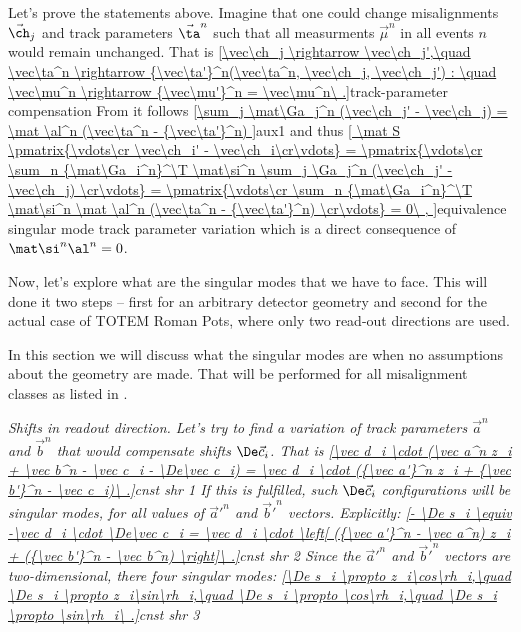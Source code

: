 Let's prove the statements above. Imagine that one could change misalignments $\vec\ch_j$ and track parameters $\vec\ta^n$ such that all measurments $\vec\mu^n$ in all events $n$ would remain unchanged. That is
\eqref{\vec\ch_j \rightarrow \vec\ch_j',\quad \vec\ta^n \rightarrow {\vec\ta'}^n(\vec\ta^n, \vec\ch_j, \vec\ch_j') : \quad \vec\mu^n \rightarrow {\vec\mu'}^n = \vec\mu^n\ .}{track-parameter compensation}
From  it follows
\eqref{\sum_j \mat\Ga_j^n (\vec\ch_j' - \vec\ch_j) = \mat \al^n (\vec\ta^n - {\vec\ta'}^n) }{aux1}
and thus
\eqref{
\mat S \pmatrix{\vdots\cr \vec\ch_i' - \vec\ch_i\cr\vdots} = 
\pmatrix{\vdots\cr \sum_n {\mat\Ga_i^n}^\T \mat\si^n \sum_j \Ga_j^n (\vec\ch_j' - \vec\ch_j) \cr\vdots} =
\pmatrix{\vdots\cr \sum_n {\mat\Ga_i^n}^\T \mat\si^n \mat \al^n (\vec\ta^n - {\vec\ta'}^n) \cr\vdots} = 0\ ,
}{equivalence singular mode track parameter variation}
which is a direct consequence of $\mat\si^n \al^n = 0$.

Now, let's explore what are the singular modes that we have to face. This will done it two steps -- first for an arbitrary detector geometry and second for the actual case of TOTEM Roman Pots, where only two read-out directions are used.



In this section we will discuss what the singular modes are when no assumptions about the geometry are made. That will be performed for all misalignment classes as listed in .

\em{Shifts in readout direction}. Let's try to find a variation of track parameters $\vec a^n$ and $\vec b^n$ that would compensate shifts $\De\vec c_i$. That is
\eqref{\vec d_i \cdot (\vec a^n z_i + \vec b^n - \vec c_i - \De\vec c_i) = \vec d_i \cdot ({\vec a'}^n z_i + {\vec b'}^n - \vec c_i)\ .}{cnst shr 1}
If this is fulfilled, such $\De\vec c_i$ configurations will be singular modes, for all values of ${\vec a'}^n$ and ${\vec b'}^n$ vectors. Explicitly:
\eqref{- \De s_i \equiv -\vec d_i \cdot \De\vec c_i = \vec d_i \cdot \left[ ({\vec a'}^n - \vec a^n) z_i + ({\vec b'}^n - \vec b^n) \right]\ .}{cnst shr 2}
Since the ${\vec a'}^n$ and ${\vec b'}^n$ vectors are two-dimensional, there four singular modes:
\eqref{\De s_i \propto z_i\cos\rh_i,\quad \De s_i \propto z_i\sin\rh_i,\quad \De s_i \propto \cos\rh_i,\quad \De s_i \propto \sin\rh_i\ .}{cnst shr 3}


